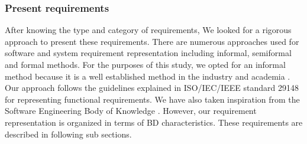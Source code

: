 \documentclass{bmcart}
\begin{document}
\subsubsection{Present requirements}
After knowing the type and category of requirements, We looked for a rigorous approach to present these requirements. There are numerous approaches used for software and system requirement representation including informal, semiformal and formal methods. For the purposes of this study, we opted for an informal method because it is a well established method in the industry and academia \cite{kassab2014state}. Our approach follows the guidelines explained in ISO/IEC/IEEE standard 29148 \cite{ISO29148} for representing functional requirements. We have also taken inspiration from the Software Engineering Body of Knowledge \cite{abran2004software}. However, our requirement representation is organized in terms of BD characteristics. These requirements are described in following sub sections. 





        


\end{document}
